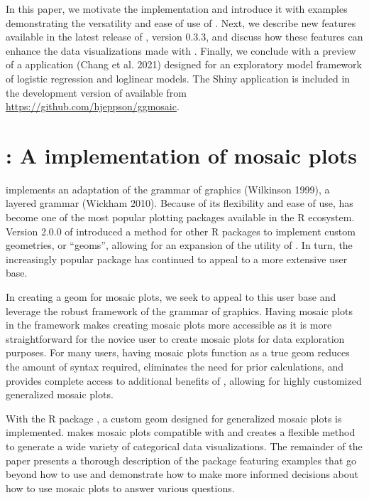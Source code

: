 In this paper, we motivate the  implementation and introduce it with examples demonstrating the versatility and ease of use of . Next, we describe new features available in the latest release of , version 0.3.3, and discuss how these features can enhance the data visualizations made with . Finally, we conclude with a preview of a  application (Chang et al. 2021) designed for an exploratory model framework of logistic regression and loglinear models. The Shiny application is included in the development version of  available from \url{https://github.com/hjeppson/ggmosaic}.

\hypertarget{a-implementation-of-mosaic-plots}{%
\section*{\texorpdfstring{: A  implementation of mosaic plots}{: A  implementation of mosaic plots}}\label{a-implementation-of-mosaic-plots}}

 implements an adaptation of the grammar of graphics (Wilkinson 1999), a layered grammar (Wickham 2010). Because of its flexibility and ease of use,  has become one of the most popular plotting packages available in the R ecosystem. Version 2.0.0 of  introduced a method for other R packages to implement custom geometries, or ``geoms'', allowing for an expansion of the utility of . In turn, the increasingly popular package has continued to appeal to a more extensive user base.

In creating a  geom for mosaic plots, we seek to appeal to this user base and leverage the robust framework of the grammar of graphics. Having mosaic plots in the  framework makes creating mosaic plots more accessible as it is more straightforward for the novice user to create mosaic plots for data exploration purposes. For many users, having mosaic plots function as a true  geom reduces the amount of syntax required, eliminates the need for prior calculations, and provides complete access to additional benefits of , allowing for highly customized generalized mosaic plots.

With the R package , a custom  geom designed for generalized mosaic plots is implemented.  makes mosaic plots compatible with  and creates a flexible method to generate a wide variety of categorical data visualizations. The remainder of the paper presents a thorough description of the  package featuring examples that go beyond how to use  and demonstrate how to make more informed decisions about how to use mosaic plots to answer various questions.

